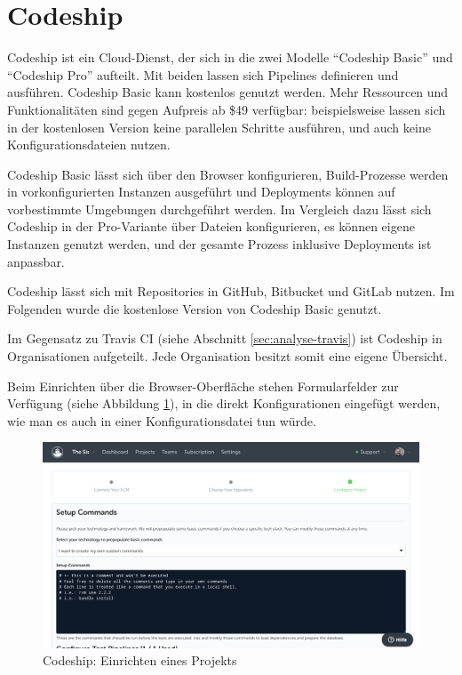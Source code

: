 \section{Codeship}

Codeship ist ein Cloud-Dienst, der sich in die zwei Modelle ``Codeship Basic'' und ``Codeship Pro'' aufteilt. Mit beiden lassen sich Pipelines definieren und ausführen. Codeship Basic kann kostenlos genutzt werden. Mehr Ressourcen und Funktionalitäten sind gegen Aufpreis ab \$49 verfügbar: beispielsweise lassen sich in der kostenlosen Version keine parallelen Schritte ausführen, und auch keine Konfigurationsdateien nutzen.

Codeship Basic lässt sich über den Browser konfigurieren, Build-Prozesse werden in vorkonfigurierten Instanzen ausgeführt und Deployments können auf vorbestimmte Umgebungen durchgeführt werden. Im Vergleich dazu lässt sich Codeship in der Pro-Variante über Dateien konfigurieren, es können eigene Instanzen genutzt werden, und der gesamte Prozess inklusive Deployments ist anpassbar.

Codeship lässt sich mit Repositories in GitHub, Bitbucket und GitLab nutzen. Im Folgenden wurde die kostenlose Version von Codeship Basic genutzt.

Im Gegensatz zu Travis CI (siehe Abschnitt \ref{sec:analyse-travis}) ist Codeship in Organisationen aufgeteilt. Jede Organisation besitzt somit eine eigene Übersicht.

Beim Einrichten über die Browser-Oberfläche stehen Formularfelder zur Verfügung (siehe Abbildung \ref{fig:codeship-setup}), in die direkt Konfigurationen eingefügt werden, wie man es auch in einer Konfigurationsdatei tun würde.

\begin{figure}[h]
  \caption{Codeship: Einrichten eines Projekts}
  \label{fig:codeship-setup}
  \includegraphics[width=.8\textwidth]{assets/codeship-setup}
\end{figure}

